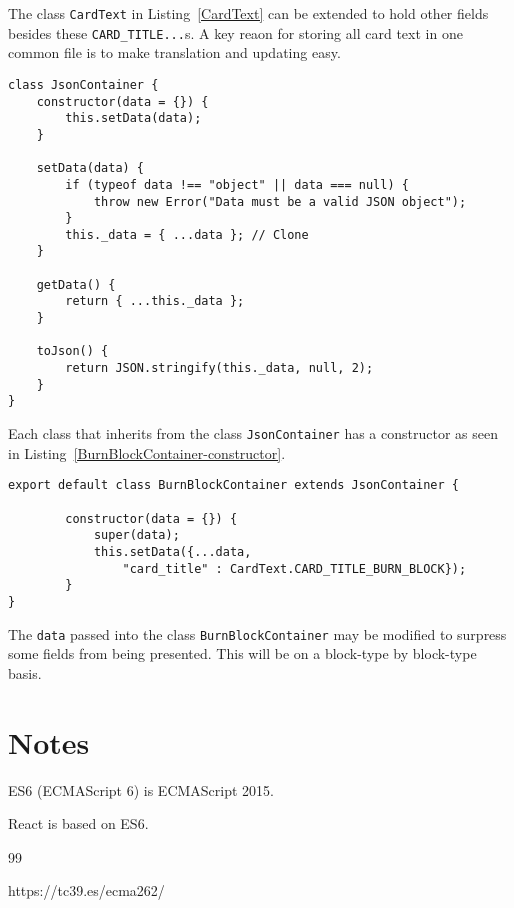 \documentclass[12pt]{article}
\begin{document}
The class \lstinline|CardText| in 
Listing~\ref{CardText} can be extended to hold other fields besides these \lstinline|CARD_TITLE...|s.
A key reaon for storing all card text in one common file is to make translation and updating easy.

%
%
\vspace{0.2in}
%
%


\begin{lstlisting}[label=JsonContainer,style=JSES6Base, caption={JsonContainer class}]
class JsonContainer {
    constructor(data = {}) {
        this.setData(data);
    }

    setData(data) {
        if (typeof data !== "object" || data === null) {
            throw new Error("Data must be a valid JSON object");
        }
        this._data = { ...data }; // Clone 
    }

    getData() {
        return { ...this._data };
    }

    toJson() {
        return JSON.stringify(this._data, null, 2);
    }
}
\end{lstlisting}

%
%
\vspace{0.2in}
%
%

Each class that inherits from the class \lstinline|JsonContainer| has a constructor as seen in Listing~\ref{BurnBlockContainer-constructor}.



%
%
%
\begin{lstlisting}[label=BurnBlockContainer-constructor,style=JSES6Base, caption={BurnBlockContainer inheriting from JsonContainer}]
export default class BurnBlockContainer extends JsonContainer {
   
        constructor(data = {}) {
            super(data);
            this.setData({...data, 
				"card_title" : CardText.CARD_TITLE_BURN_BLOCK});
        }
}
\end{lstlisting}

The \lstinline|data| passed into the class \lstinline|BurnBlockContainer| may be modified to surpress some fields from being
presented.
This will be on a block-type by block-type basis.

%
%
\vspace{0.2in}
%
%

%
%
\section{Notes}
%
%

ES6 (ECMAScript 6) is ECMAScript 2015.

React is based on ES6.


%
%
%
%
\begin {thebibliography}{99}
%


https://tc39.es/ecma262/



\end {thebibliography}
\end{document}
